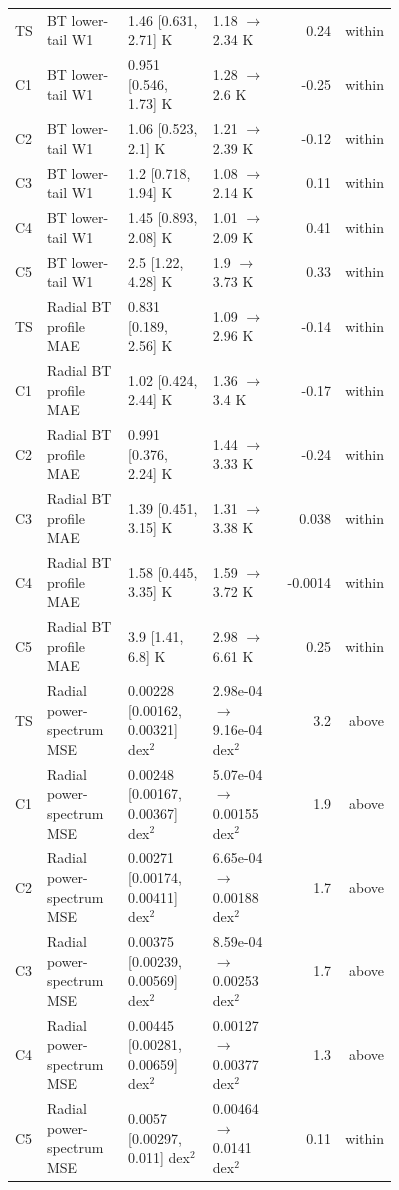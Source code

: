 \begin{supertabular}{p{0.055\linewidth}p{0.23\linewidth}p{0.25\linewidth}p{0.22\linewidth}rr}
TS & BT lower-tail W1 & 1.46 [0.631, 2.71] K & 1.18 $\rightarrow$ 2.34 K & 0.24 & within \\
C1 & BT lower-tail W1 & 0.951 [0.546, 1.73] K & 1.28 $\rightarrow$ 2.6 K & -0.25 & within \\
C2 & BT lower-tail W1 & 1.06 [0.523, 2.1] K & 1.21 $\rightarrow$ 2.39 K & -0.12 & within \\
C3 & BT lower-tail W1 & 1.2 [0.718, 1.94] K & 1.08 $\rightarrow$ 2.14 K & 0.11 & within \\
C4 & BT lower-tail W1 & 1.45 [0.893, 2.08] K & 1.01 $\rightarrow$ 2.09 K & 0.41 & within \\
C5 & BT lower-tail W1 & 2.5 [1.22, 4.28] K & 1.9 $\rightarrow$ 3.73 K & 0.33 & within \\
TS & Radial BT profile MAE & 0.831 [0.189, 2.56] K & 1.09 $\rightarrow$ 2.96 K & -0.14 & within \\
C1 & Radial BT profile MAE & 1.02 [0.424, 2.44] K & 1.36 $\rightarrow$ 3.4 K & -0.17 & within \\
C2 & Radial BT profile MAE & 0.991 [0.376, 2.24] K & 1.44 $\rightarrow$ 3.33 K & -0.24 & within \\
C3 & Radial BT profile MAE & 1.39 [0.451, 3.15] K & 1.31 $\rightarrow$ 3.38 K & 0.038 & within \\
C4 & Radial BT profile MAE & 1.58 [0.445, 3.35] K & 1.59 $\rightarrow$ 3.72 K & -0.0014 & within \\
C5 & Radial BT profile MAE & 3.9 [1.41, 6.8] K & 2.98 $\rightarrow$ 6.61 K & 0.25 & within \\
TS & Radial power-spectrum MSE & 0.00228 [0.00162, 0.00321] dex$^2$ & 2.98e-04 $\rightarrow$ 9.16e-04 dex$^2$ & 3.2 & above \\
C1 & Radial power-spectrum MSE & 0.00248 [0.00167, 0.00367] dex$^2$ & 5.07e-04 $\rightarrow$ 0.00155 dex$^2$ & 1.9 & above \\
C2 & Radial power-spectrum MSE & 0.00271 [0.00174, 0.00411] dex$^2$ & 6.65e-04 $\rightarrow$ 0.00188 dex$^2$ & 1.7 & above \\
C3 & Radial power-spectrum MSE & 0.00375 [0.00239, 0.00569] dex$^2$ & 8.59e-04 $\rightarrow$ 0.00253 dex$^2$ & 1.7 & above \\
C4 & Radial power-spectrum MSE & 0.00445 [0.00281, 0.00659] dex$^2$ & 0.00127 $\rightarrow$ 0.00377 dex$^2$ & 1.3 & above \\
C5 & Radial power-spectrum MSE & 0.0057 [0.00297, 0.011] dex$^2$ & 0.00464 $\rightarrow$ 0.0141 dex$^2$ & 0.11 & within \\

\end{supertabular}
